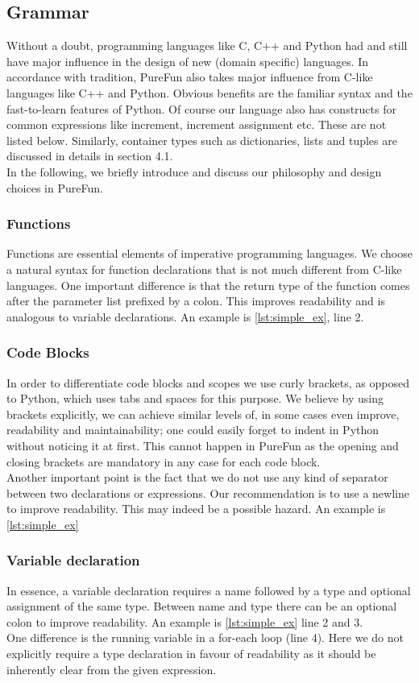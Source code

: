 \subsection{Grammar}
Without a doubt, programming languages like C, C++ and Python had and still have major influence in the design of new (domain specific) languages. In accordance with tradition, PureFun also takes major influence from C-like languages like C++ and Python. Obvious benefits are the familiar syntax and the fast-to-learn features of Python. Of course our language also has constructs for common expressions like increment, increment assignment etc. These are not listed below. Similarly, container types such as dictionaries, lists and tuples are discussed in details in section 4.1.\\
In the following, we briefly introduce and discuss our philosophy and design choices in PureFun.
\subsubsection{Functions} Functions are essential elements of imperative programming languages. We choose a natural syntax for function declarations that is not much different from C-like languages. One important difference is that the return type of the function comes after the parameter list prefixed by a colon. This improves readability and is analogous to variable declarations. An example is \ref{lst:simple_ex}, line 2.
\subsubsection{Code Blocks} In order to differentiate code blocks and scopes we use curly brackets, as opposed to Python, which uses tabs and spaces for this purpose. We believe by using brackets explicitly, we can achieve similar levels of, in some cases even improve, readability and maintainability; one could easily forget to indent in Python without noticing it at first. This cannot happen in PureFun as the opening and closing brackets are mandatory in any case for each code block.\\
Another important point is the fact that we do not use any kind of separator between two declarations or expressions. Our recommendation is to use a newline to improve readability. This may indeed be a possible hazard. An example is \ref{lst:simple_ex}
\subsubsection{Variable declaration} In essence, a variable declaration requires a name followed by a type and optional assignment of the same type. Between name and type there can be an optional colon to improve readability. An example is \ref{lst:simple_ex} line 2 and 3.\\
One difference is the running variable in a for-each loop (line 4). Here we do not explicitly require a type declaration in favour of readability as it should be inherently clear from the given expression.

